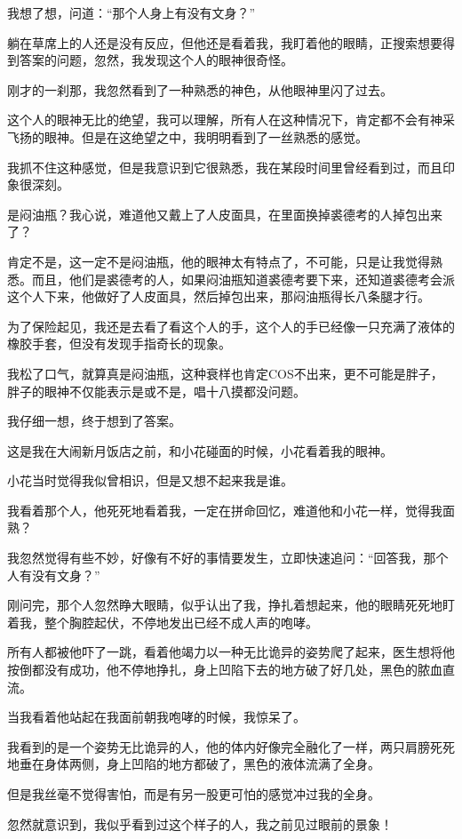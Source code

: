 我想了想，问道：“那个人身上有没有文身？”

躺在草席上的人还是没有反应，但他还是看着我，我盯着他的眼睛，正搜索想要得到答案的问题，忽然，我发现这个人的眼神很奇怪。

刚才的一刹那，我忽然看到了一种熟悉的神色，从他眼神里闪了过去。

这个人的眼神无比的绝望，我可以理解，所有人在这种情况下，肯定都不会有神采飞扬的眼神。但是在这绝望之中，我明明看到了一丝熟悉的感觉。

我抓不住这种感觉，但是我意识到它很熟悉，我在某段时间里曾经看到过，而且印象很深刻。

是闷油瓶？我心说，难道他又戴上了人皮面具，在里面换掉裘德考的人掉包出来了？

肯定不是，这一定不是闷油瓶，他的眼神太有特点了，不可能，只是让我觉得熟悉。而且，他们是裘德考的人，如果闷油瓶知道裘德考要下来，还知道裘德考会派这个人下来，他做好了人皮面具，然后掉包出来，那闷油瓶得长八条腿才行。

为了保险起见，我还是去看了看这个人的手，这个人的手已经像一只充满了液体的橡胶手套，但没有发现手指奇长的现象。

我松了口气，就算真是闷油瓶，这种衰样也肯定COS不出来，更不可能是胖子，胖子的眼神不仅能表示是或不是，唱十八摸都没问题。

我仔细一想，终于想到了答案。

这是我在大闹新月饭店之前，和小花碰面的时候，小花看着我的眼神。

小花当时觉得我似曾相识，但是又想不起来我是谁。

我看着那个人，他死死地看着我，一定在拼命回忆，难道他和小花一样，觉得我面熟？

我忽然觉得有些不妙，好像有不好的事情要发生，立即快速追问：“回答我，那个人有没有文身？”

刚问完，那个人忽然睁大眼睛，似乎认出了我，挣扎着想起来，他的眼睛死死地盯着我，整个胸腔起伏，不停地发出已经不成人声的咆哮。

所有人都被他吓了一跳，看着他竭力以一种无比诡异的姿势爬了起来，医生想将他按倒都没有成功，他不停地挣扎，身上凹陷下去的地方破了好几处，黑色的脓血直流。

当我看着他站起在我面前朝我咆哮的时候，我惊呆了。

我看到的是一个姿势无比诡异的人，他的体内好像完全融化了一样，两只肩膀死死地垂在身体两侧，身上凹陷的地方都破了，黑色的液体流满了全身。

但是我丝毫不觉得害怕，而是有另一股更可怕的感觉冲过我的全身。

忽然就意识到，我似乎看到过这个样子的人，我之前见过眼前的景象！

